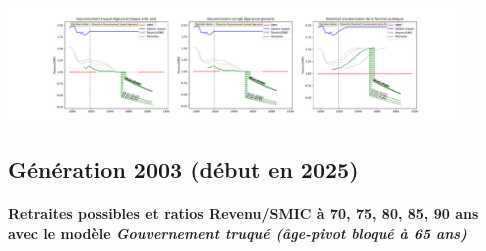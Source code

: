  \begin{center}\includegraphics[width=0.9\textwidth]{fig/AideSoignant_1990_22_dest_retraite.pdf}\end{center} \label{fig/AideSoignant_1990_22_dest_retraite.pdf} 

\newpage 
 
\subsection{Génération 2003 (début en 2025)} 

\paragraph{Retraites possibles et ratios Revenu/SMIC à 70, 75, 80, 85, 90 ans avec le modèle \emph{Gouvernement truqué (âge-pivot bloqué à 65 ans)}}  
 
